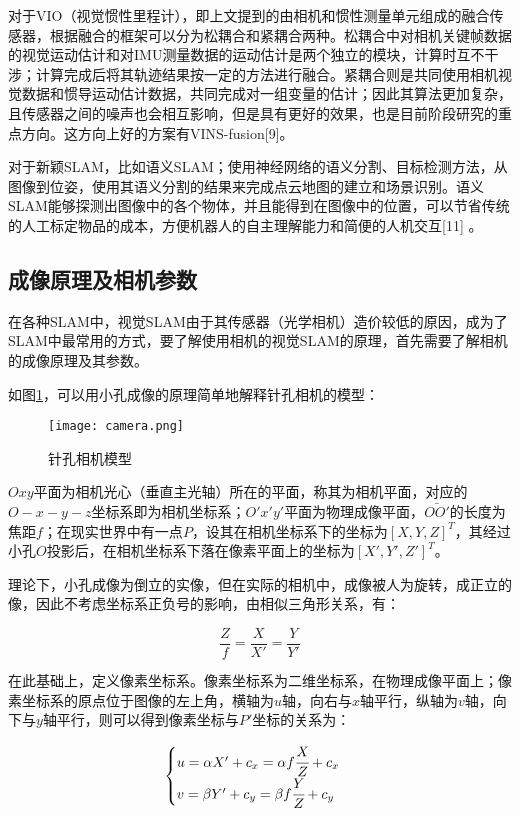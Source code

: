 对于VIO（视觉惯性里程计），即上文提到的由相机和惯性测量单元组成的融合传感器，根据融合的框架可以分为松耦合和紧耦合两种。松耦合中对相机关键帧数据的视觉运动估计和对IMU测量数据的运动估计是两个独立的模块，计算时互不干涉；计算完成后将其轨迹结果按一定的方法进行融合。紧耦合则是共同使用相机视觉数据和惯导运动估计数据，共同完成对一组变量的估计；因此其算法更加复杂，且传感器之间的噪声也会相互影响，但是具有更好的效果，也是目前阶段研究的重点方向。这方向上好的方案有VINS-fusion[9]。


对于新颖SLAM，比如语义SLAM；使用神经网络的语义分割、目标检测方法，从图像到位姿，使用其语义分割的结果来完成点云地图的建立和场景识别。语义SLAM能够探测出图像中的各个物体，并且能得到在图像中的位置，可以节省传统的人工标定物品的成本，方便机器人的自主理解能力和简便的人机交互[11] 。


\subsection{成像原理及相机参数} \label{3.1.2}
在各种SLAM中，视觉SLAM由于其传感器（光学相机）造价较低的原因，成为了SLAM中最常用的方式，要了解使用相机的视觉SLAM的原理，首先需要了解相机的成像原理及其参数。

如图\ref{fig4}，可以用小孔成像的原理简单地解释针孔相机的模型：
\begin{figure}[!ht]
	\centering
	\texttt{[image: camera.png]}
	\caption{针孔相机模型} 
	\label{fig4}
\end{figure}

$Oxy$平面为相机光心（垂直主光轴）所在的平面，称其为相机平面，对应的$O-x-y-z$坐标系即为相机坐标系；$O'x'y'$平面为物理成像平面，$\bar{OO'}$的长度为焦距$f$；在现实世界中有一点$P$，设其在相机坐标系下的坐标为$[X, Y, Z]^T$，其经过小孔$O$投影后，在相机坐标系下落在像素平面上的坐标为$[X', Y', Z']^T$。

理论下，小孔成像为倒立的实像，但在实际的相机中，成像被人为旋转，成正立的像，因此不考虑坐标系正负号的影响，由相似三角形关系，有：

$$
\frac{Z}{f}=\frac{X}{X'}=\frac{Y}{Y'}
$$

在此基础上，定义像素坐标系。像素坐标系为二维坐标系，在物理成像平面上；像素坐标系的原点位于图像的左上角，横轴为$u$轴，向右与$x$轴平行，纵轴为$v$轴，向下与$y$轴平行，则可以得到像素坐标与$P'$坐标的关系为：

$$
\begin{cases}
u=\alpha X'+c_x=\alpha f \cfrac{X}{Z}+c_x \\
v=\beta Y' +c_y=\beta f  \cfrac{Y}{Z}+c_y \\
\end{cases}
$$

